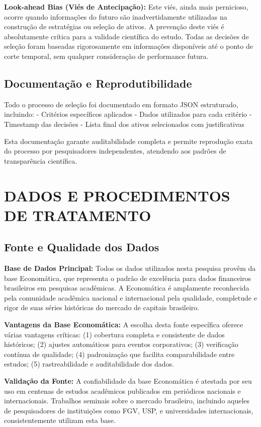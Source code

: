 \textbf{Look-ahead Bias (Viés de Antecipação):} Este viés, ainda mais pernicioso, ocorre quando informações do futuro são inadvertidamente utilizadas na construção de estratégias ou seleção de ativos. A prevenção deste viés é absolutamente crítica para a validade científica do estudo. Todas as decisões de seleção foram baseadas rigorosamente em informações disponíveis até o ponto de corte temporal, sem qualquer consideração de performance futura.

\subsection{Documentação e Reprodutibilidade}

Todo o processo de seleção foi documentado em formato JSON estruturado, incluindo:
- Critérios específicos aplicados
- Dados utilizados para cada critério
- Timestamp das decisões
- Lista final dos ativos selecionados com justificativas

Esta documentação garante auditabilidade completa e permite reprodução exata do processo por pesquisadores independentes, atendendo aos padrões de transparência científica.

\section{DADOS E PROCEDIMENTOS DE TRATAMENTO}

\subsection{Fonte e Qualidade dos Dados}

\textbf{Base de Dados Principal:} Todos os dados utilizados nesta pesquisa provêm da base Economática, que representa o padrão de excelência para dados financeiros brasileiros em pesquisas acadêmicas. A Economática é amplamente reconhecida pela comunidade acadêmica nacional e internacional pela qualidade, completude e rigor de suas séries históricas do mercado de capitais brasileiro.

\textbf{Vantagens da Base Economática:} A escolha desta fonte específica oferece várias vantagens críticas: (1) cobertura completa e consistente de dados históricos; (2) ajustes automáticos para eventos corporativos; (3) verificação contínua de qualidade; (4) padronização que facilita comparabilidade entre estudos; (5) rastreabilidade e auditabilidade dos dados.

\textbf{Validação da Fonte:} A confiabilidade da base Economática é atestada por seu uso em centenas de estudos acadêmicos publicados em periódicos nacionais e internacionais. Trabalhos seminais sobre o mercado brasileiro, incluindo aqueles de pesquisadores de instituições como FGV, USP, e universidades internacionais, consistentemente utilizam esta base.

